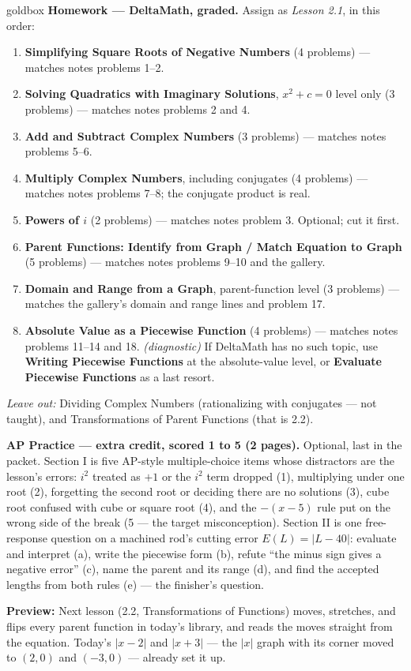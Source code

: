 \documentclass[10pt]{article}
\begin{document}
\begin{skillbox}{goldbox}
\textbf{Homework --- DeltaMath, graded.} Assign as \textit{Lesson 2.1}, in this order:
\begin{enumerate}[itemsep=1pt,topsep=2pt]
  \item \textbf{Simplifying Square Roots of Negative Numbers} (4 problems) --- matches notes
        problems 1--2.
  \item \textbf{Solving Quadratics with Imaginary Solutions}, $x^2 + c = 0$ level only
        (3 problems) --- matches notes problems 2 and 4.
  \item \textbf{Add and Subtract Complex Numbers} (3 problems) --- matches notes problems 5--6.
  \item \textbf{Multiply Complex Numbers}, including conjugates (4 problems) --- matches notes
        problems 7--8; the conjugate product is real.
  \item \textbf{Powers of $i$} (2 problems) --- matches notes problem 3. Optional; cut it first.
  \item \textbf{Parent Functions: Identify from Graph / Match Equation to Graph} (5 problems)
        --- matches notes problems 9--10 and the gallery.
  \item \textbf{Domain and Range from a Graph}, parent-function level (3 problems) --- matches
        the gallery's domain and range lines and problem 17.
  \item \textbf{Absolute Value as a Piecewise Function} (4 problems) --- matches notes problems
        11--14 and 18. \textit{(diagnostic)} If DeltaMath has no such topic, use
        \textbf{Writing Piecewise Functions} at the absolute-value level, or \textbf{Evaluate
        Piecewise Functions} as a last resort.
\end{enumerate}
\textit{Leave out:} Dividing Complex Numbers (rationalizing with conjugates --- not taught), and
Transformations of Parent Functions (that is 2.2).

\textbf{AP Practice --- extra credit, scored 1 to 5 (2 pages).} Optional, last in the packet.
Section I is five AP-style multiple-choice items whose distractors are the lesson's errors:
$i^2$ treated as $+1$ or the $i^2$ term dropped (1), multiplying under one root (2), forgetting
the second root or deciding there are no solutions (3), cube root confused with cube or square
root (4), and the $-(x - 5)$ rule put on the wrong side of the break (5 --- the target
misconception). Section II is one free-response question on a machined rod's cutting error
$E(L) = |L - 40|$: evaluate and interpret (a), write the piecewise form (b), refute ``the minus
sign gives a negative error'' (c), name the parent and its range (d), and find the accepted
lengths from both rules (e) --- the finisher's question.

\textbf{Preview:} Next lesson (2.2, Transformations of Functions) moves, stretches, and flips
every parent function in today's library, and reads the moves straight from the equation.
Today's $|x - 2|$ and $|x + 3|$ --- the $|x|$ graph with its corner moved to $(2, 0)$ and
$(-3, 0)$ --- already set it up.
\end{skillbox}
\end{document}
